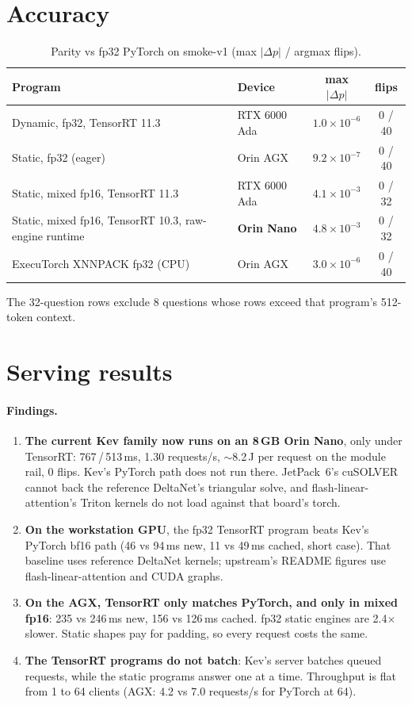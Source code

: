 \documentclass[10pt]{article}
\begin{document}
\section{Accuracy}
\begin{table}[h]\centering\small
\caption{Parity vs fp32 PyTorch on smoke-v1 (max $|\Delta p|$ / argmax flips).}\label{tab:parity}
\begin{tabular}{llcc}\toprule
Program & Device & max $|\Delta p|$ & flips\\\midrule
Dynamic, fp32, TensorRT 11.3 & RTX 6000 Ada & $1.0\times10^{-6}$ & 0 / 40\\
Static, fp32 (eager) & Orin AGX & $9.2\times10^{-7}$ & 0 / 40\\
Static, mixed fp16, TensorRT 11.3 & RTX 6000 Ada & $4.1\times10^{-3}$ & 0 / 32\\
Static, mixed fp16, TensorRT 10.3, raw-engine runtime & \textbf{Orin Nano} & $4.8\times10^{-3}$ & 0 / 32\\
ExecuTorch XNNPACK fp32 (CPU) & Orin AGX & $3.0\times10^{-6}$ & 0 / 40\\\bottomrule
\end{tabular}\end{table}
The 32-question rows exclude 8 questions whose rows exceed that program's 512-token context.

\section{Serving results}

\FloatBarrier

\paragraph{Findings.}
\begin{enumerate}
\item \textbf{The current Kev family now runs on an 8\,GB Orin Nano}, only under TensorRT: 767\,/\,513\,ms, 1.30 requests/s, $\sim$8.2\,J per request on the module rail, 0 flips. Kev's PyTorch path does not run there. JetPack~6's cuSOLVER cannot back the reference DeltaNet's triangular solve, and flash-linear-attention's Triton kernels do not load against that board's torch.
\item \textbf{On the workstation GPU}, the fp32 TensorRT program beats Kev's PyTorch bf16 path (46 vs 94\,ms new, 11 vs 49\,ms cached, short case). That baseline uses reference DeltaNet kernels; upstream's README figures use flash-linear-attention and CUDA graphs.
\item \textbf{On the AGX, TensorRT only matches PyTorch, and only in mixed fp16}: 235 vs 246\,ms new, 156 vs 126\,ms cached. fp32 static engines are 2.4$\times$ slower. Static shapes pay for padding, so every request costs the same.
\item \textbf{The TensorRT programs do not batch}: Kev's server batches queued requests, while the static programs answer one at a time. Throughput is flat from 1 to 64 clients (AGX: 4.2 vs 7.0 requests/s for PyTorch at 64).
\end{enumerate}
\end{document}
